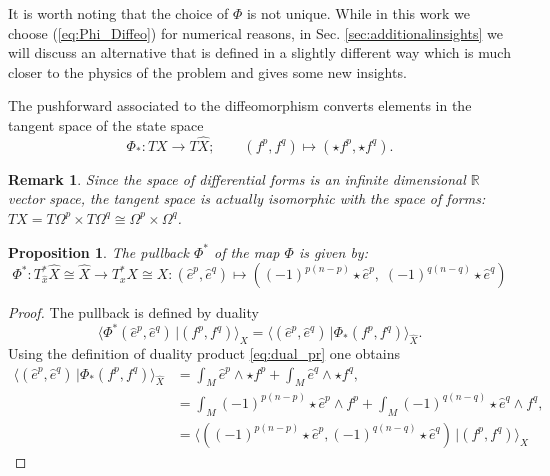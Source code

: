 \documentclass{elsarticle}
\newtheorem{remark}{Remark}
\newtheorem{proposition}{Proposition}
\newcommand{\bbR}{\mathbb{R}}
\newcommand*{\dual}[1]{\ensuremath{\widehat{#1}}}
\newcommand{\dualpr}[3][]{\ensuremath{\langle #2 \, \vert #3 \rangle_{#1}}}
\begin{document}
It is worth noting that the choice of $\Phi$ is not unique. While in this work we choose (\ref{eq:Phi_Diffeo})  for numerical reasons, in Sec. \ref{sec:additionalinsights} we will discuss an alternative that is defined in a slightly different way which is much closer to the physics of the problem and gives some new insights.

The pushforward associated to the diffeomorphism converts elements in the tangent space of the state space
\begin{equation}\label{eq:pushfor_phi}
\Phi_* : T X \rightarrow T \dual{X}; \qquad     (f^p, f^q) 
\mapsto  (\star f^p, \star f^q).
\end{equation}



\begin{remark}
Since the space of differential forms is an infinite dimensional $\bbR$ vector space, the tangent space  is actually isomorphic with the space of forms: $TX = T\Omega^p \times T\Omega^q \cong \Omega^p \times \Omega^q$. 
\end{remark}
\begin{proposition}\label{pr:pullback_phi}
The pullback $\Phi^*$ of the map $\Phi$ is given by:
\begin{equation}
\label{eq:pullback_phi}
\Phi^*: T^*_{\dual{x}} \dual{X} \cong \dual{X} \rightarrow T^*_x X \cong X: 
(\dual{e}^p, \dual{e}^q) \mapsto ((-1)^{p(n-p)}\star \dual{e}^p, \; (-1)^{q(n-q)}\star \dual{e}^q) 
\end{equation}
\end{proposition}
\begin{proof}
The pullback is defined by duality
\begin{equation}
    \dualpr[X]{\Phi^* (\dual{e}^p, \dual{e}^q)}{(f^p, f^q)} = \dualpr[\dual{X}]{(\dual{e}^p, \dual{e}^q)}{\Phi_*(f^p, f^q)}.
\end{equation}
Using the definition of duality product \eqref{eq:dual_pr} one obtains
\begin{equation}
    \begin{aligned}
    \dualpr[\dual{X}]{(\dual{e}^p, \dual{e}^q)}{\Phi_*(f^p, f^q)} &=\int_M \dual{e}^p \wedge \star f^p + \int_M \dual{e}^q \wedge \star f^q, \\
        &= \int_M (-1)^{p(n-p)}\star \dual{e}^p \wedge f^p + \int_M (-1)^{q(n-q)}\star \dual{e}^q \wedge f^q, \\
        &=  \dualpr[X]{((-1)^{p(n-p)}\star \dual{e}^p, (-1)^{q(n-q)}\star \dual{e}^q)}{(f^p, f^q)}
    \end{aligned}
\end{equation}
\end{proof}
\end{document}
